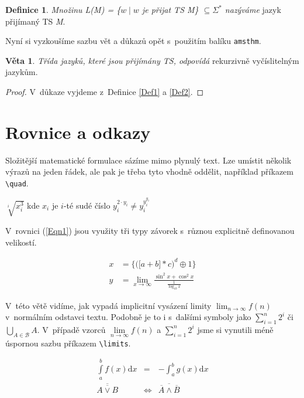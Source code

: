 \documentclass[11pt, a4paper]{article}
\theoremstyle{definition}
\newtheorem{definice}{Definice}
\newtheorem{veta}{Věta}
\begin{document}
\begin{twocolumn}
\begin{definice}
\textit{Množinu L(M) = \{$w \mid w$ je přijat TS M\} $\subseteq \Sigma^*$ nazýváme} jazyk přijímaný TS \textit{M}.
\end{definice}

Nyní si vyzkoušíme sazbu vět a důkazů opět s~použitím balíku \verb|amsthm|.

\begin{veta}
\textit{Třída jazyků, které jsou přijímány TS, odpovídá} rekurzivně vyčíslitelným jazykům.
\end{veta}

\begin{proof}
V~důkaze vyjdeme z~Definice \ref{Def1} a \ref{Def2}.
\end{proof}

\section{Rovnice a odkazy}
Složitější matematické formulace sázíme mimo plynulý
text. Lze umístit několik výrazů na jeden řádek, ale pak je
třeba tyto vhodně oddělit, například příkazem \verb|\quad|.

\smallskip
\begin{center}
    $\sqrt[i]{x_i^3}$ kde $x_i$ je $i$-té sudé číslo \quad $y_i^{2\cdot y_i} \neq y_i^{y_i^{y_i}}$
\end{center}

V~rovnici (\ref{Eqn1}) jsou využity tři typy závorek s~různou explicitně definovanou velikostí.

\begin{align}
x &= \bigg\{ \Big( \big[ a + b \big] * c \Big)^d \oplus 1 \bigg\} \label{Eqn1} \\
y &= \lim_{x\to\infty} \frac{\sin^2 x + \cos^2 x}{\frac{1}{\log_{10}x}} \nonumber
\end{align}

V~této větě vidíme, jak vypadá implicitní vysázení limity $\lim_{n \to \infty} f(n)$ v~normálním odstavci textu. Podobně je to i s~dalšími symboly jako $\sum_{i=1}^n 2^i$ či $\bigcup_{A \in \mathcal{B}} A$. V~případě vzorců $\lim\limits_{n\to\infty} f(n)$ a $\sum\limits_{i=1}^n 2^i$ jsme si vynutili méně úspornou sazbu příkazem \verb|\limits|.

\begin{eqnarray}
\int\limits_{a}^{b} f(x) \mathrm{d}x &= & - \int_{a}^{b} g(x) \mathrm{d}x\\
\overline{\overline{A \vee B}} &\Leftrightarrow & \overline{\overline{A} \wedge \overline{B}} 
\end{eqnarray}


\end{twocolumn}
\end{document}

